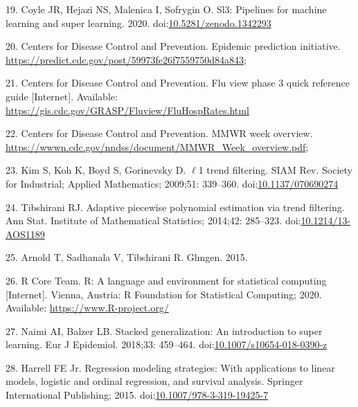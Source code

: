 \documentclass[10pt,letterpaper]{article}
\begin{document}
\leavevmode\hypertarget{ref-Coyle2020-ze}{}%
19. Coyle JR, Hejazi NS, Malenica I, Sofrygin O. Sl3: Pipelines for
machine learning and super learning. 2020.
doi:\href{https://doi.org/10.5281/zenodo.1342293}{10.5281/zenodo.1342293}

\leavevmode\hypertarget{ref-Centers_for_Disease_Control_and_Prevention_undated-tx}{}%
20. Centers for Disease Control and Prevention. Epidemic prediction
initiative. \url{https://predict.cdc.gov/post/59973fe26f7559750d84a843};

\leavevmode\hypertarget{ref-Centers_for_Disease_Control_and_Prevention_undated-vt}{}%
21. Centers for Disease Control and Prevention. Flu view phase 3 quick
reference guide {[}Internet{]}. Available:
\url{https://gis.cdc.gov/GRASP/Fluview/FluHospRates.html}

\leavevmode\hypertarget{ref-Centers_for_Disease_Control_and_Prevention_undated-pu}{}%
22. Centers for Disease Control and Prevention. MMWR week overview.
\url{https://wwwn.cdc.gov/nndss/document/MMWR_Week_overview.pdf};

\leavevmode\hypertarget{ref-Kim2009-bz}{}%
23. Kim S, Koh K, Boyd S, Gorinevsky D. \(\ell\)1 trend filtering. SIAM
Rev. Society for Industrial; Applied Mathematics; 2009;51: 339--360.
doi:\href{https://doi.org/10.1137/070690274}{10.1137/070690274}

\leavevmode\hypertarget{ref-Tibshirani2014-tr}{}%
24. Tibshirani RJ. Adaptive piecewise polynomial estimation via trend
filtering. Ann Stat. Institute of Mathematical Statistics; 2014;42:
285--323.
doi:\href{https://doi.org/10.1214/13-AOS1189}{10.1214/13-AOS1189}

\leavevmode\hypertarget{ref-Arnold2015-tb}{}%
25. Arnold T, Sadhanala V, Tibshirani R. Glmgen. 2015.

\leavevmode\hypertarget{ref-RCore2020-ct}{}%
26. R Core Team. R: A language and environment for statistical computing
{[}Internet{]}. Vienna, Austria: R Foundation for Statistical Computing;
2020. Available: \url{https://www.R-project.org/}

\leavevmode\hypertarget{ref-Naimi2018-fv}{}%
27. Naimi AI, Balzer LB. Stacked generalization: An introduction to
super learning. Eur J Epidemiol. 2018;33: 459--464.
doi:\href{https://doi.org/10.1007/s10654-018-0390-z}{10.1007/s10654-018-0390-z}

\leavevmode\hypertarget{ref-Harrell2015-cd}{}%
28. Harrell FE Jr. Regression modeling strategies: With applications to
linear models, logistic and ordinal regression, and survival analysis.
Springer International Publishing; 2015.
doi:\href{https://doi.org/10.1007/978-3-319-19425-7}{10.1007/978-3-319-19425-7}
\end{document}
